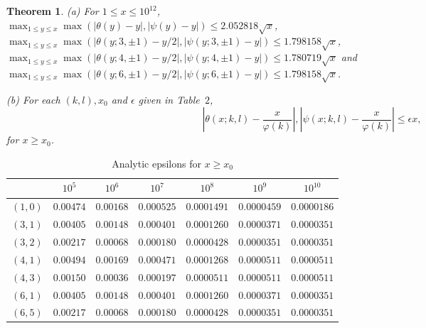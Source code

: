 \documentclass{jT}
\newtheorem{theorem}{Theorem}[section]
\theoremstyle{definition}
\begin{document}
\begin{theorem}
\label{thm:theta}
\noindent
{\rm (a)}
For $1 \leq x \leq 10^{12}$,\\
$\displaystyle \max_{1 \leq y \leq x} \max \left( \left| \theta(y) - y \right|, \left| \psi(y) - y \right| \right)
\leq 2.052818 \sqrt{x}$,\\
$\displaystyle \max_{1 \leq y \leq x} \max \left( \left| \theta(y; 3, \pm 1) - y/2 \right|, \left| \psi(y; 3, \pm 1) - y \right|  \right)
\leq 1.798158 \sqrt{x}$,\\
$\displaystyle \max_{1 \leq y \leq x} \max \left( \left| \theta(y; 4, \pm 1) - y/2 \right|, \left| \psi(y; 4, \pm 1) - y \right|  \right)
\leq 1.780719 \sqrt{x}$ and \\
$\displaystyle \max_{1 \leq y \leq x} \max \left( \left| \theta(y; 6, \pm 1) - y/2 \right|, \left| \psi(y; 6, \pm 1) - y \right|  \right)
\leq 1.798158 \sqrt{x}$.

\noindent
{\rm (b)}
For each $(k,l), x_{0}$ and $\epsilon$ given in Table~$2$,
\begin{displaymath}
\left| \theta(x; k, l) - \frac{x}{\varphi(k)} \right|, \left| \psi(x; k, l) - \frac{x}{\varphi(k)} \right| \leq \epsilon x,
\end{displaymath}
for $x \geq x_{0}$.
\end{theorem}

\begin{table}[ht]
\begin{center}
\begin{tabular}{||c|c|c|c|c|c|c||} \hline 
        &  $10^{5}$  &  $10^{6}$  &  $10^{7}$  &  $10^{8}$   &   $10^{9}$  &  $10^{10}$  \\ \hline
$(1,0)$ &  $0.00474$ &  $0.00168$ & $0.000525$ & $0.0001491$ & $0.0000459$ & $0.0000186$ \\ \hline
$(3,1)$ &  $0.00405$ &  $0.00148$ & $0.000401$ & $0.0001260$ & $0.0000371$ & $0.0000351$ \\ \hline
$(3,2)$ &  $0.00217$ &  $0.00068$ & $0.000180$ & $0.0000428$ & $0.0000351$ & $0.0000351$ \\ \hline
$(4,1)$ &  $0.00494$ &  $0.00169$ & $0.000471$ & $0.0001268$ & $0.0000511$ & $0.0000511$ \\ \hline
$(4,3)$ &  $0.00150$ &  $0.00036$ & $0.000197$ & $0.0000511$ & $0.0000511$ & $0.0000511$ \\ \hline
$(6,1)$ &  $0.00405$ &  $0.00148$ & $0.000401$ & $0.0001260$ & $0.0000371$ & $0.0000351$ \\ \hline
$(6,5)$ &  $0.00217$ &  $0.00068$ & $0.000180$ & $0.0000428$ & $0.0000351$ & $0.0000351$ \\ \hline
\end{tabular}
\caption{Analytic epsilons for $x \geq x_{0}$}
\end{center}
\end{table}
\end{document}

